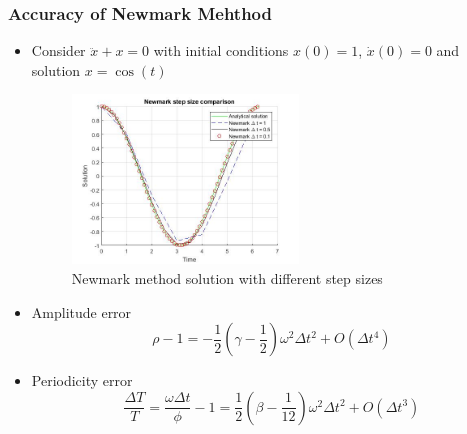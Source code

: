 \documentclass[xcolor=svgnames,9pt]{beamer}
\theoremstyle{remark}
\begin{document}
		\begin{frame}
  			\frametitle{Accuracy of Newmark Mehthod}
			\begin{itemize}
				\item Consider $\ddot{x} + x = 0$ with initial conditions $x(0) = 1$, $\dot{x}(0) = 0$ and solution  $x = \cos(t)$
				\begin{figure}[h!]
   					 \centering
   					 \includegraphics[width=60mm]{pictures/NMStepSize.jpg}
   					 \caption{Newmark method solution with different step sizes}
				            \label{fig17}
  				\end{figure}
			\item Amplitude error
\small
				\begin{equation*}
					\rho - 1 = -\frac{1}{2}\left( \gamma - \frac{1}{2} \right)\omega^2\Delta t^2 + O(\Delta t^4)
				\end{equation*}
			\item Periodicity error
				\begin{equation*}
					\frac{\Delta T}{T} =\frac{\omega \Delta t}{\phi} - 1 = \frac{1}{2}\left( \beta - \frac{1}{12} \right)\omega^2\Delta t^2 + O(\Delta t^3)
				\end{equation*}
			\end{itemize}
		\end{frame}
\end{document}
